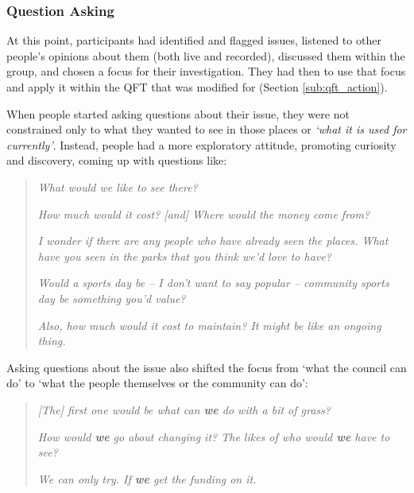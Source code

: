 \subsubsection{Question Asking}
At this point, participants had identified and flagged issues, listened to other people's opinions about them (both live and recorded), discussed them within the group, and chosen a focus for their investigation. They had then to use that focus and apply it within the QFT that was modified for (Section \ref{sub:qft_action}).

When people started asking questions about their issue, they were not constrained only to what they wanted to see in those places or \textit{`what it is used for currently'}. Instead, people had a more exploratory attitude, promoting curiosity and discovery, coming up with questions like:
\begin{quote}
   \textit{What would we like to see there?}
   
    \textit{How much would it cost? [and] Where would the money come from?}
    
    \textit{I wonder if there are any people who have already seen the places. What have you seen in the parks that you think we'd love to have?}
    
    \textit{Would a sports day be -- I don't want to say popular -- community sports day be something you'd value?}
    
    \textit{Also, how much would it cost to maintain? It might be like an ongoing thing.}
\end{quote}

Asking questions about the issue also shifted the focus from `what the council can do' to `what the people themselves or the community can do':
\begin{quote}
       \textit{[The] first one would be what can \textbf{we} do with a bit of grass?}
       
       \textit{How would \textbf{we} go about changing it? The likes of who would \textbf{we} have to see?}
       
       \textit{We can only try. If \textbf{we} get the funding on it.}
\end{quote}

